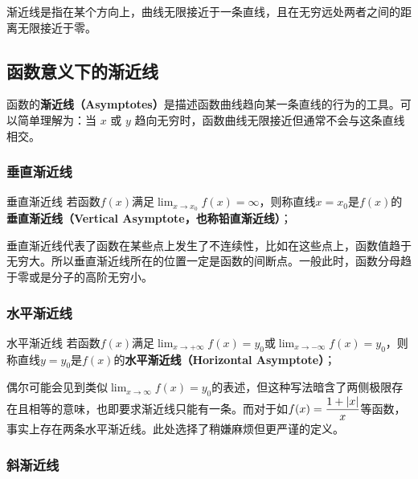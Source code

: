 
\begin{issues}
\issueDraft
\end{issues}

渐近线是指在某个方向上，曲线无限接近于一条直线，且在无穷远处两者之间的距离无限接近于零。

\subsection{函数意义下的渐近线}
函数的\textbf{渐近线（Asymptotes）}是描述函数曲线趋向某一条直线的行为的工具。可以简单理解为：当  $x$  或  $y$  趋向无穷时，函数曲线无限接近但通常不会与这条直线相交。
\subsubsection{垂直渐近线}

\begin{definition}{垂直渐近线}
若函数$f(x)$满足$\displaystyle \lim_{x\to x_0}f(x)=\infty$，则称直线$x=x_0$是$f(x)$的\textbf{垂直渐近线（Vertical Asymptote，也称铅直渐近线）}；
\end{definition}

垂直渐近线代表了函数在某些点上发生了不连续性，比如在这些点上，函数值趋于无穷大。所以垂直渐近线所在的位置一定是函数的间断点。一般此时，函数分母趋于零或是分子的高阶无穷小。

\subsubsection{水平渐近线}

\begin{definition}{水平渐近线}
若函数$f(x)$满足$\displaystyle \lim_{x\to +\infty}f(x)=y_0$或$\displaystyle \lim_{x\to -\infty}f(x)=y_0$，则称直线$y=y_0$是$f(x)$的\textbf{水平渐近线（Horizontal Asymptote）}；
\end{definition}

偶尔可能会见到类似$\displaystyle \lim_{x\to \infty}f(x)=y_0$的表述，但这种写法暗含了两侧极限存在且相等的意味，也即要求渐近线只能有一条。而对于如$\displaystyle f(x)={1+|x|\over x}$等函数，事实上存在两条水平渐近线。此处选择了稍嫌麻烦但更严谨的定义。

\subsubsection{斜渐近线}

